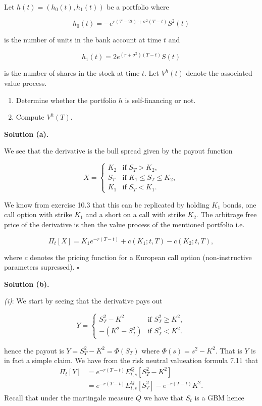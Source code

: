 \documentclass[a4paper,12pt,openany]{book}
\providecommand{\tightlist}{%
 \setlength{\itemsep}{0pt}\setlength{\parskip}{0pt}}
\begin{document}
Let \(h(t)=(h_0(t),h_1(t))\) be a portfolio where

\[
h_0(t)=-e^{r(T-2t)+\sigma^2(T-t)}S^2(t)
\]

is the number of units in the bank account at time \(t\) and

\[
h_1(t)=2e^{(r+\sigma^2)(T-t)}S(t)
\]

is the number of shares in the stock at time \(t\). Let \(V^h(t)\) denote the associated value process.

\begin{enumerate}
\def\labelenumi{\alph{enumi}.}
\setcounter{enumi}{2}
\tightlist
\item
  Determine whether the portfolio \(h\) is self-financing or not.
\item
  Compute \(V^h(T)\).
\end{enumerate}

\textbf{Solution (a).}

We see that the derivative is the bull spread given by the payout function

\[
X=
\begin{cases}
  K_2 & \text{if }S_T>K_2,\\
  S_T & \text{if }K_1\le S_T\le K_2,\\
  K_1 &\text{if }S_T< K_1.
\end{cases}
\]

We know from exercise 10.3 that this can be replicated by holding \(K_1\) bonds, one call option with strike \(K_1\) and a short on a call with strike \(K_2\). The arbitrage free price of the derivative is then the value process of the mentioned portfolio i.e.

\[
\Pi_t[X]=K_1 e^{-r(T-t)}+c(K_1;t,T)-c(K_2;t,T),
\]

where \(c\) denotes the pricing function for a European call option (non-instructive parameters supressed). \(\square\)

\textbf{Solution (b).}

\emph{(i)}: We start by seeing that the derivative pays out

\[
Y=
\begin{cases}
  S_T^2-K^2 & \text{if }S_T^2\ge K^2,\\
  -(K^2-S_T^2) &\text{if }S_T^2< K^2.
\end{cases}
\]

hence the payout is \(Y=S_T^2-K^2=\Phi(S_T)\) where \(\Phi(s)=s^2-K^2\). That is \(Y\) is in fact a simple claim. We have from the risk neutral valueation formula 7.11 that
\begin{align*}
\Pi_t[Y]&=e^{-r(T-t)}E^Q_{t,s}[S_T^2-K^2]\\
&=e^{-r(T-t)}E^Q_{t,s}[S_T^2]-e^{-r(T-t)}K^2.
\end{align*}
Recall that under the martingale measure \(Q\) we have that \(S_t\) is a GBM hence
\end{document}
